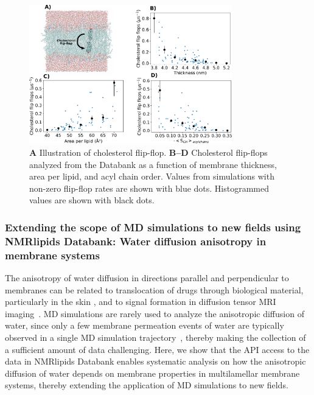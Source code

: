 \documentclass[fleqn,10pt]{wlscirep}
\begin{document}
\begin{figure}[htb]
    \centering
    \includegraphics[width=88mm]{Figures/CholFlipFlops.pdf}
    \caption{\textbf{A} Illustration of cholesterol flip-flop.  
      \textbf{B--D} Cholesterol flip-flops analyzed from the Databank as a function of membrane thickness, area per lipid, and acyl chain order. Values from simulations with non-zero flip-flop rates are shown with blue dots. Histogrammed values are shown with black dots.
    }
    \label{fig:flip-flops}
\end{figure}



\subsubsection{Extending the scope of MD simulations to new fields using NMRlipids Databank: Water diffusion anisotropy in membrane systems}
The anisotropy of water diffusion in directions parallel and perpendicular to membranes can be related to translocation of drugs through biological material, particularly in the skin \cite{hansen13,wen18,nitsche19,roberts21}, and to signal formation in diffusion tensor MRI imaging~\cite{topgaard20}. MD simulations are rarely used to analyze the anisotropic diffusion of water, since only a few membrane permeation events of water are typically observed in a single MD simulation trajectory~\cite{venable19,camilo2022}, thereby making the collection of a sufficient amount of data challenging. Here, we show that the API access to the data in NMRlipids Databank enables systematic analysis on how the anisotropic diffusion of water depends on membrane properties in multilamellar membrane systems, thereby extending the application of MD simulations to new fields. 
\end{document}
